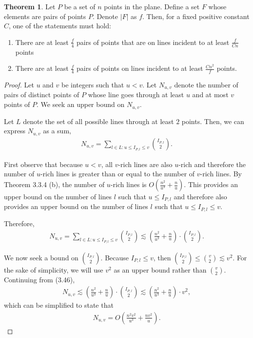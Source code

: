 \documentclass{scrippsthesisclass}
\theoremstyle{definition}
\newtheorem{theorem}{Theorem}[section]
\begin{document}
\begin{theorem}
    Let $P$ be a set of $n$ points in the plane. 
    Define a set $F$ whose elements are pairs of points $P$.
    Denote $|F|$ as $f$. 
    Then, for a fixed positive constant $C$, one of the statements must hold:
    \begin{enumerate}
        \item There are at least $\frac{f}{4}$ pairs of points that are on lines incident to at least $\frac{f}{Cn}$ points
        \item There are at least $\frac{f}{4}$ pairs of points on lines incident to at least $\frac{Cn^2}{f}$ points. 
    \end{enumerate}
\end{theorem}
\begin{proof}
    Let $u$ and $v$ be integers such that $u < v$. 
    Let $N_{u, v}$ denote the number of pairs of distinct points of $P$ whose line goes through at least $u$ and at most $v$ points of $P$. 
    We seek an upper bound on $N_{u, v}$.

    Let $L$ denote the set of all possible lines through at least $2$ points.
    Then, we can express $N_{u,v}$ as a sum,
    \begin{align}
        N_{u,v} = \sum_{l \in L: u \leq I_{P, l} \leq v} {I_{P, l} \choose 2}.
    \end{align}

    First observe that because $u < v$, all $v$-rich lines are also $u$-rich and therefore the number of $u$-rich lines is greater than or equal to the number of $v$-rich lines. 
    By Theorem 3.3.4 (b), the number of $u$-rich lines is $O\left(\frac{n^2}{u^3} + \frac{n}{u}\right)$.
    This provides an upper bound on the number of lines $l$ such that $u \leq I_{P, l}$ and therefore also provides an upper bound on the number of lines $l$ such that $u \leq I_{P, l} \leq v$.

    Therefore, 
    \begin{align}
        N_{u,v} = \sum_{l \in L: u \leq I_{P, l} \leq v} {I_{P, l} \choose 2} \lesssim \left(\frac{n^2}{u^3} + \frac{n}{u}\right) \cdot {I_{P, l} \choose 2}.
    \end{align}

    We now seek a bound on ${I_{P, l} \choose 2}$. 
    Because $I_{P, l} \leq v$, then ${I_{P, l} \choose 2} \leq {v \choose 2} \lesssim v^2$.
    For the sake of simplicity, we will use $v^2$ as an upper bound rather than ${v \choose 2}$. 
    Continuing from (3.46), 
    \begin{align}
        N_{u,v} \lesssim \left(\frac{n^2}{u^3} + \frac{n}{u}\right) \cdot {I_{P, l} \choose 2} \lesssim \left(\frac{n^2}{u^3} + \frac{n}{u}\right) \cdot v^2,
    \end{align}
    which can be simplified to state that 
    \begin{align}
        N_{u,v} = O\left(\frac{n^2v^2}{u^3} + \frac{nv^2}{u} \right).
    \end{align}


\end{proof}
\end{document}
